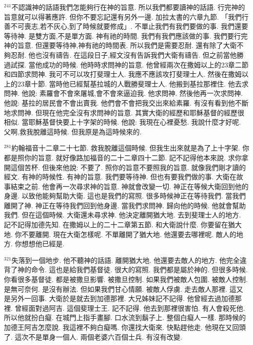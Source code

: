 \documentclass{book}
\begin{document}
$^{241}$不認識神的話語我們怎能夠行在神的旨意.
所以我們都要讀神的話語.
行完神的旨意就可以得著應許.
但你不要忘記還有另外一邊.
加拉太書的六章九節.
「我們行善不可喪志,若不灰心,到了時候就要修成」.
不單止我們有我們要做的事.
我們還要等待神.
是雙方面,不是單方面.
神有祂的時間.
我們有我們應該做的事.
我們要行完神的旨意.
但還要等待神,神有祂的時間表.
所以我們是需要忍耐.
還有除了大衛不夠忍耐.
他也沒有禱告.
在這段日子,經文沒有告訴我們大衛有禱告.
但之前當他勝過試探.
當他成功的時候.
他時時求問神的旨意.
他曾經兩次在撒姆以上的23章二節和四節求問神.
我可不可以攻打斐理士人.
我應不應該攻打斐理士人.
然後在撒姆以上的23章十節.
當時他已經幫基拉城的人戰勝斐理士人.
他搬到基拉那裡住.
他去求問神.
他說: 素羅會不會來屠城,會不會來逼迫我.
他求問神.
然後他再一次求問神.
他說: 基拉的居民會不會出賣我.
他們會不會把我交出來給素羅.
有沒有看到他不斷地求問神.
但現在他完全沒有求問神的旨意.
其實大衛的經歷和耶穌基督的經歷很相似.
當耶穌基督快要上十字架的時候.
他說: 我現在心裡憂愁.
我說什麼才好呢.
父啊,救我脫離這時候.
但我原是為這時候來的.

$^{281}$約翰福音十二章二十七節.
救我脫離這個時候.
但我生出來就是為了上十字架.
你都是照你的旨意.
就好像路加福音的二十二章四十二節.
記不記得他本來說.
求你拿開這個苦杯.
但後來他說: 不要了.
照你的旨意不要照我的旨意.
就像我們剛才讀的經文.
有神的時候性.
有神的旨意.
我們要等待神.
但也有要我們做的事.
大衛在故事結束之前.
他會再一次尋求神的旨意.
神就會改變一切.
神正在等候大衛回到他的身邊.
以致他能夠幫助大衛.
這也是我們的寫照.
很多時候神正在等待我們.
當我們離開了神.
神正在等待我們回到他身邊.
當我們求問神.
歸向他的時候.
他就會幫助我們.
但在這個時候.
大衛還未尋求神.
他決定離開猶大地.
去到斐理士人的地方.
記不記得加德先知.
在撒姆以上的二十二章第五節.
和大衛說什麼.
你要留在猶大地.
你不要離開.
現在大衛怎樣呢.
不單離開了猶大地.
他還要去哪裡呢.
敵人的地方.
你想想他已經是.

$^{321}$失落到一個地步.
他不聽神的話語.
離開猶大地.
他還要去敵人的地方.
他完全違背了神的命令.
這也是給我們基督徒.
很大的寫照.
我們都是屬於神的.
但很多時候.
你看很多基督徒.
都是被撒旦影響.
被撒旦控制.
如果我們被敵人包圍.
被敵人控制.
是無可奈何.
是沒有辦法.
但如果我們甘心情願.
被敵人俘虜.
走去敵人那裡.
這又是另外一回事.
大衛於是就去到加德那裡.
大兄姊妹記不記得.
他曾經去過加德那裡.
曾經面對過阿吉.
這個斐理士王.
記不記得.
他去到那裡很害怕.
有人會殺死他.
所以他就扮白癡.
在城門上指手畫腳.
口水流到鬍子上.
整個白癡人一樣.
那時候的加德王阿吉怎麼說.
我這裡不夠白癡嗎.
你還找大衛來.
快點趕他走.
他現在又回頭了.
這次不是單身一個人.
兩個老婆六百個士兵.
有沒有改變.
\end{document}
